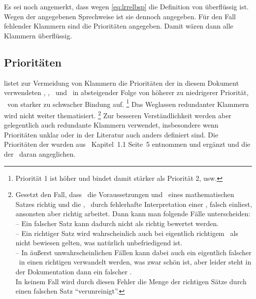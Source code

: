 Es sei noch angemerkt, dass wegen \eqref{eq:lrrelbsp} die Definition von \chrqt{$\metarep$}  überflüssig ist.
Wegen der angegebenen Sprechweise ist sie dennoch angegeben.
Für den Fall fehlender Klammern sind die Prioritäten  angegeben.
Damit wären dann alle Klammern  überflüssig.

\subsection{Prioritäten}%
\label{sub:Prioritäten}

 listet zur Vermeidung von Klammern die Prioritäten der in diesem Dokument verwendeten \Operatoren, \Relationen, \Junktoren\ und \Definitionen\ in absteigender Folge von höherer zu niedrigerer Priorität, \textdh\ von starker zu schwacher Bindung auf.%
\footnote{Priorität 1 ist höher und bindet damit stärker als Priorität 2, usw.}
Das Weglassen redundanter Klammern wird  nicht weiter thematisiert.%
\footnote{%
	Gesetzt den Fall, dass \ASBA\ die Voraussetzungen und \Folgerungen\ eines mathematischen Satzes richtig und die \Beweisschritte, \textzB\ durch fehlerhafte Interpretation einer \Formel, falsch einliest, ansonsten aber richtig arbeitet.
	Dann kann man folgende Fälle unterscheiden:\\
	-- Ein falscher Satz kann dadurch nicht als richtig bewertet werden.\\
	-- Ein richtiger Satz wird wahrscheinlich auch bei eigentlich richtigem \Beweis\ als nicht bewiesen gelten, was natürlich unbefriedigend ist.\\
	-- In äußerst unwahrscheinlichen Fällen kann dabei auch ein eigentlich falscher \Beweis\ in einen richtigen verwandelt werden, was zwar schön ist, aber leider steht in der Dokumentation dann ein falscher \Beweis.\\
	In keinem Fall wird durch diesen Fehler die Menge der richtigen Sätze durch einen falschen Satz \enquote{verunreinigt}.
}
Zur besseren Verständlichkeit werden aber gelegentlich auch redundante Klammern verwendet, insbesondere wenn Prioritäten unklar oder in der Literatur auch anders definiert sind.
Die Prioritäten der \Junktoren wurden aus~\cite{bib:Rautenberg} Kapitel~1.1 Seite~5 entnommen und ergänzt und die der \Metaoperatoren\ daran angeglichen.

